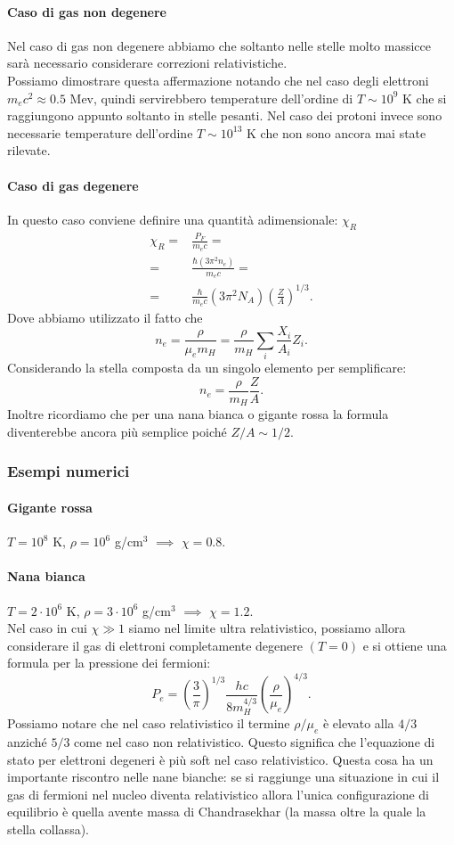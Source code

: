 \paragraph{Caso di gas non degenere}
Nel caso di gas non degenere abbiamo che soltanto nelle stelle molto massicce sarà necessario considerare correzioni relativistiche. \\
Possiamo dimostrare questa affermazione notando che nel caso degli elettroni $m_ec^2\approx 0.5$ Mev, quindi servirebbero temperature dell'ordine di $T\sim 10^{9}$ K che si raggiungono appunto soltanto in stelle pesanti. Nel caso dei protoni invece sono necessarie temperature dell'ordine $T\sim 10^{13}$ K che non sono ancora mai state rilevate.
\paragraph{Caso di gas degenere}
In questo caso conviene definire una quantità adimensionale: $\chi_{R}$ 
\[\begin{aligned}
	\chi_R 
	=&
	\frac{P_F}{m_ec} =\\
	=&
	\frac{\hbar \left( 3\pi^2n_e \right)}{m_e c} =\\
	=&
	\frac{\hbar }{m_ec}\left( 3\pi^2N_A \right) \left( \frac{Z}{A} \right) ^{1/3}
.\end{aligned}\]
Dove abbiamo utilizzato il fatto che
\[
	n_e = \frac{\rho }{\mu_e m_H} = \frac{\rho}{m_H}\sum_{i}^{} \frac{X_i}{A_i}Z_i
.\] 
Considerando la stella composta da un singolo elemento per semplificare:
\[
	n_e = \frac{\rho }{m_H}\frac{Z}{A}
.\] 
Inoltre ricordiamo che per una nana bianca o gigante rossa la formula diventerebbe ancora più semplice poiché $Z/A \sim 1/2$.
\subsubsection{Esempi numerici}
\label{subsubsec:Esempi numerici}
\paragraph{Gigante rossa}
$T=10^{8}$ K, $\rho = 10^6$ g/cm$^3$ $\implies$ $\chi = 0.8$.
\paragraph{Nana bianca}
$T=2 \cdot 10^{6}$ K, $\rho = 3 \cdot 10^{6}$ g/cm$^3$ $\implies$ $\chi = 1.2$.\\
Nel caso in cui $\chi \gg 1$ siamo nel limite ultra relativistico, possiamo allora considerare il gas di elettroni completamente degenere $\left( T=0 \right)$ e si ottiene una formula per la pressione dei fermioni:
\[
	P_e 
	=
	\left( \frac{3}{\pi} \right) ^{1/3} \frac{hc}{8m_H^{4/3}}\left( \frac{\rho }{\mu_e} \right) ^{4/3}
.\] 
Possiamo notare che nel caso relativistico il termine $\rho / \mu_e$ è elevato alla $4/3$ anziché $5/3$ come nel caso non relativistico. Questo significa che l'equazione di stato per elettroni degeneri è più soft nel caso relativistico. Questa cosa ha un importante riscontro nelle nane bianche: se si raggiunge una situazione in cui il gas di fermioni nel nucleo diventa relativistico allora l'unica configurazione di equilibrio è quella avente massa di Chandrasekhar (la massa oltre la quale la stella collassa). 
